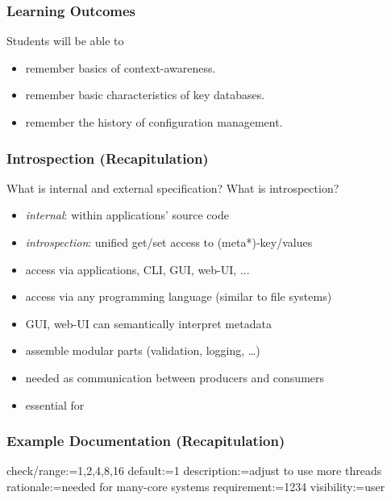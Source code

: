 \begin{frame}
	\frametitle{Learning Outcomes}
	Students will be able to
	\begin{itemize}
	\item remember basics of context-awareness.
	\item remember basic characteristics of key databases.
	\item remember the history of configuration management.
	\end{itemize}
\end{frame}


\begin{frame}
	\frametitle{Introspection (Recapitulation)}
	\begin{task}
	What is internal and external specification?
	What is introspection?
	\end{task}

	\pause
	\vspace{1em}

	\begin{itemize}
	\item \textit{internal}: within applications' source code
	\item \textit{introspection}: unified get/set access to (meta*)-key/values
	\item access via applications, CLI, GUI, web-UI, ...
	\item access via any programming language (similar to file systems)
	\item GUI, web-UI can semantically interpret metadata
	\item assemble modular parts (validation, logging, \dots)
	\item needed as communication between producers and consumers
	\item essential for ~\citet{holland2001nofutz}
	\end{itemize}
\end{frame}

\begin{frame}[fragile]
	\frametitle{Example Documentation (Recapitulation)}

	\begin{code}
	  check/range:=1,2,4,8,16
	  default:=1
	  description:=adjust to use more threads
	  rationale:=needed for many-core systems
	  requirement:=1234
	  visibility:=user
	\end{code}
\end{frame}

